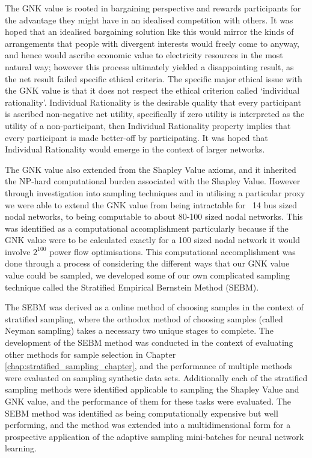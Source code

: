 The GNK value is rooted in bargaining perspective and rewards participants for the advantage they might have in an idealised competition with others.
It was hoped that an idealised bargaining solution like this would mirror the kinds of arrangements that people with divergent interests would freely come to anyway, and hence would ascribe economic value to electricity resources in the most natural way; however this process ultimately yielded a disappointing result, as the net result failed specific ethical criteria.
The specific major ethical issue with the GNK value is that it does not respect the ethical criterion called `individual rationality'.
Individual Rationality is the desirable quality that every participant is ascribed non-negative net utility, specifically if zero utility is interpreted as the utility of a non-participant, then Individual Rationality property implies that every participant is made better-off by participating.
It was hoped that Individual Rationality would emerge in the context of larger networks.

The GNK value also extended from the Shapley Value axioms, and it inherited the NP-hard computational burden associated with the Shapley Value.
However through investigation into sampling techniques and in utilising a particular proxy we were able to extend the GNK value from being intractable for ~14 bus sized nodal networks, to being computable to about 80-100 sized nodal networks.
This was identified as a computational accomplishment particularly because if the GNK value were to be calculated exactly for a 100 sized nodal network it would involve $2^{100}$ power flow optimisations.
This computational accomplishment was done through a process of considering the different ways that our GNK value value could be sampled, we developed some of our own complicated sampling technique called the Stratified Empirical Bernstein Method (SEBM).

The SEBM was derived as a online method of choosing samples in the context of stratified sampling, where the orthodox method of choosing samples (called Neyman sampling) takes a necessary two unique stages to complete.
The development of the SEBM method was conducted in the context of evaluating other methods for sample selection in Chapter \ref{chap:stratified_sampling_chapter}, and the performance of multiple methods were evaluated on sampling synthetic data sets.
Additionally each of the stratified sampling methods were identified applicable to sampling the Shapley Value and GNK value, and the performance of them for these tasks were evaluated.
The SEBM method was identified as being computationally expensive but well performing, and the method was extended into a multidimensional form for a prospective application of the adaptive sampling mini-batches for neural network learning.

